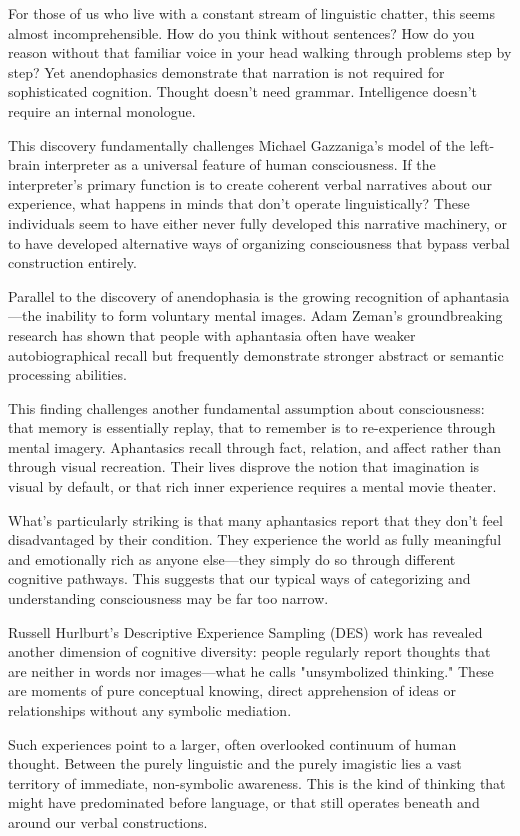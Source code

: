 For those of us who live with a constant stream of linguistic chatter, this seems almost incomprehensible. How do you think without sentences? How do you reason without that familiar voice in your head walking through problems step by step? Yet anendophasics demonstrate that narration is not required for sophisticated cognition. Thought doesn't need grammar. Intelligence doesn't require an internal monologue.

This discovery fundamentally challenges Michael Gazzaniga's model of the left-brain interpreter as a universal feature of human consciousness. If the interpreter's primary function is to create coherent verbal narratives about our experience, what happens in minds that don't operate linguistically? These individuals seem to have either never fully developed this narrative machinery, or to have developed alternative ways of organizing consciousness that bypass verbal construction entirely.

Parallel to the discovery of anendophasia is the growing recognition of aphantasia—the inability to form voluntary mental images. Adam Zeman's groundbreaking research has shown that people with aphantasia often have weaker autobiographical recall but frequently demonstrate stronger abstract or semantic processing abilities.

This finding challenges another fundamental assumption about consciousness: that memory is essentially replay, that to remember is to re-experience through mental imagery. Aphantasics recall through fact, relation, and affect rather than through visual recreation. Their lives disprove the notion that imagination is visual by default, or that rich inner experience requires a mental movie theater.

What's particularly striking is that many aphantasics report that they don't feel disadvantaged by their condition. They experience the world as fully meaningful and emotionally rich as anyone else—they simply do so through different cognitive pathways. This suggests that our typical ways of categorizing and understanding consciousness may be far too narrow.

Russell Hurlburt's Descriptive Experience Sampling (DES) work has revealed another dimension of cognitive diversity: people regularly report thoughts that are neither in words nor images—what he calls "unsymbolized thinking." These are moments of pure conceptual knowing, direct apprehension of ideas or relationships without any symbolic mediation.

Such experiences point to a larger, often overlooked continuum of human thought. Between the purely linguistic and the purely imagistic lies a vast territory of immediate, non-symbolic awareness. This is the kind of thinking that might have predominated before language, or that still operates beneath and around our verbal constructions.

